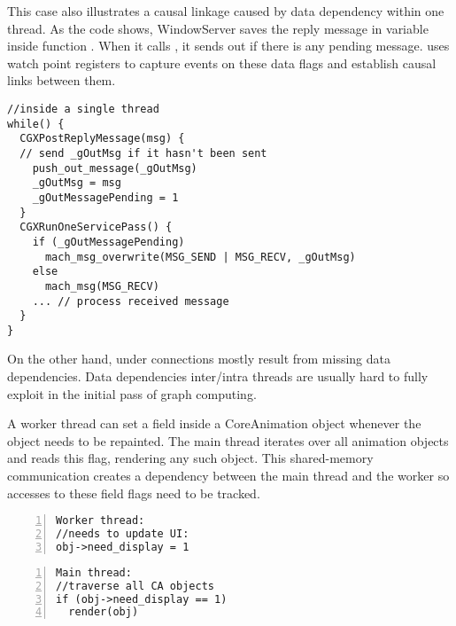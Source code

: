 This case also illustrates a causal linkage caused by data dependency within
one thread. As the code shows, WindowServer saves the reply message in variable
 inside function . When it calls
, it sends out  if there is any pending
message. \xxx uses watch point registers to capture events on these data flags
and establish causal links between them.
{\footnotesize \begin{verbatim}
//inside a single thread
while() {
  CGXPostReplyMessage(msg) {
  // send _gOutMsg if it hasn't been sent
    push_out_message(_gOutMsg)
    _gOutMsg = msg
    _gOutMessagePending = 1
  }
  CGXRunOneServicePass() {
    if (_gOutMessagePending)
      mach_msg_overwrite(MSG_SEND | MSG_RECV, _gOutMsg)
    else
      mach_msg(MSG_RECV)
    ... // process received message
  }
}
\end{verbatim}
}

On the other hand, under connections mostly result from missing data
dependencies. Data dependencies inter/intra threads are usually hard to fully
exploit in the initial pass of graph computing.


A worker thread can set a field  inside a CoreAnimation
object whenever the object needs to be repainted. The main thread iterates over
all animation objects and reads this flag, rendering any such object. This
shared-memory communication creates a dependency between the main thread and the
worker so accesses to these field flags need to be tracked.

{\footnotesize\begin{BVerbatim}[baseline=c,numbers=left]
Worker thread:
//needs to update UI:
obj->need_display = 1
\end{BVerbatim}
}
\quad
{\footnotesize\begin{BVerbatim}[baseline=c,numbers=left]
Main thread: 
//traverse all CA objects
if (obj->need_display == 1)
  render(obj)
\end{BVerbatim}
}
\bigskip


